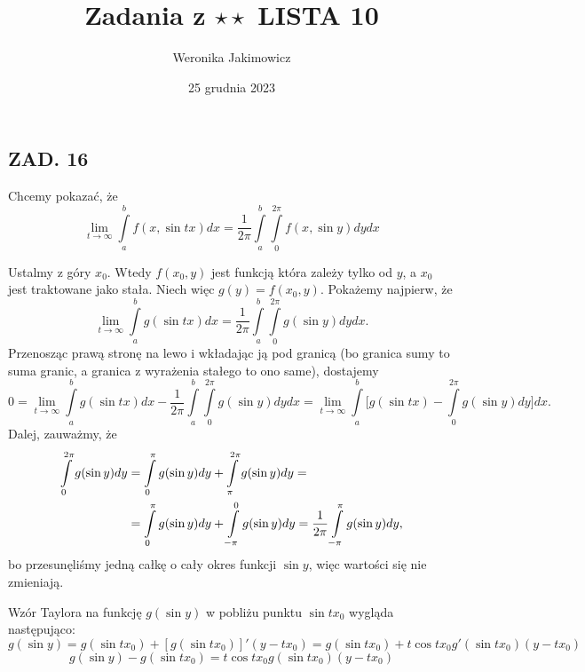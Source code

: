 \documentclass{article}[13pt]
\author{Weronika Jakimowicz}
\title{Zadania z $\star\star$ LISTA 10}
\date{25 grudnia 2023}
\begin{document}
\clearpage
\maketitle
\thispagestyle{empty}

\subsection*{ZAD. 16}
Chcemy pokazać, że
$$\lim\limits_{t\to\infty}\int\limits_a^bf(x,\sin tx)dx=\frac1{2\pi}\int\limits_a^b\int\limits_0^{2\pi}f(x,\sin y)dydx$$
\medskip

\medskip

Ustalmy z góry $x_0$. Wtedy $f(x_0, y)$ jest funkcją która zależy tylko od $y$, a $x_0$ jest traktowane jako stała. Niech więc $g(y)=f(x_0,y)$. Pokażemy najpierw, że
$$\lim\limits_{t\to\infty}\int\limits_a^bg(\sin tx)dx=\frac1{2\pi}\int\limits_a^b\int\limits_0^{2\pi}g(\sin y)dydx.$$
Przenosząc prawą stronę na lewo i wkładając ją pod granicą (bo granica sumy to suma granic, a granica z wyrażenia stałego to ono same), dostajemy
$$0=\lim\limits_{t\to\infty}\int\limits_a^bg(\sin tx)dx-\frac1{2\pi}\int\limits_a^b\int\limits_0^{2\pi}g(\sin y)dydx=\lim\limits_{t\to\infty}\int\limits_a^b\Big[g(\sin tx)-\int\limits_0^{2\pi}g(\sin y)dy\Big]dx.$$
Dalej, zauważmy, że
\begin{align*}
    \int\limits_0^{2\pi}g(\sin y)dy&=\int\limits_0^\pi g(\sin y)dy+\int\limits_\pi^{2\pi}g(\sin y)dy=\\
    &=\int\limits_0^\pi g(\sin y)dy+\int\limits_{-\pi}^0g(\sin y)dy={1\over2\pi}\int\limits_{-\pi}^\pi g(\sin y)dy,
\end{align*}
bo przesunęliśmy jedną całkę o cały okres funkcji $\sin y$, więc wartości się nie zmieniają.

Wzór Taylora na funkcję $g(\sin y)$ w pobliżu punktu $\sin tx_0$ wygląda następująco:
$$g(\sin y)=g(\sin tx_0)+[g(\sin tx_0)]'(y-tx_0)=g(\sin tx_0)+t\cos tx_0g'(\sin tx_0)(y-tx_0)$$
$$g(\sin y)-g(\sin tx_0)=t\cos tx_0g(\sin tx_0)(y-tx_0)$$
\end{document}
